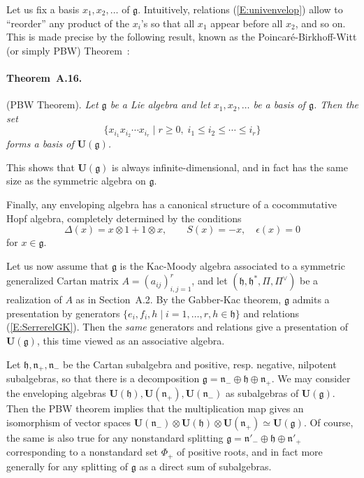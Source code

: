 \documentclass[a4paper,10pt]{amsart}
\def\U{\mathbf{U}}
\def\g{\mathfrak{g}}
\def\h{\mathfrak{h}}
\def\n{\mathfrak{n}}
\numberwithin{equation}{section}
\begin{document}
{Let us fix a basis $x_1, x_2, \ldots$ of $\g$. Intuitively, relations (\ref{E:univenvelop}) allow to ``reorder'' any product of the $x_i$'s so that all $x_1$ appear before all $x_2$, and so on. This is made precise by the following result, known as the Poincar\'e-Birkhoff-Witt (or simply PBW) Theorem~:

\vspace{.1in}

\paragraph{\textbf{Theorem~A.16.}}(PBW Theorem). \textit{Let $\g$ be a Lie algebra and let $x_1, x_2, \ldots$ be a basis of $\g$. Then the set
$$\{x_{i_1} x_{i_2} \cdots x_{i_r}\;|\; r \geq 0, \;i_1 \leq i_2 \leq \cdots \leq i_r\}$$
forms a basis of $\U(\g)$.}

\vspace{.15in}

This shows that $\U(\g)$ is always infinite-dimensional, and in fact has the same size as the symmetric algebra on $\g$.

\vspace{.15in}

Finally, any enveloping algebra has a canonical structure of a cocommutative Hopf algebra, completely determined by the conditions
$$\Delta(x)=x \otimes 1 + 1 \otimes x, \qquad S(x)=-x, \quad \epsilon(x)=0$$
for $x \in \g$.

\vspace{.2in}

Let us now assume that $\g$ is the Kac-Moody algebra associated to a symmetric generalized Cartan matrix $A=(a_{ij})_{i,j=1}^r$, and let $(\h,\h^*,\Pi,\Pi^{\vee})$ be a realization of $A$ as in Section~A.2.
By the Gabber-Kac theorem, $\g$ admits a presentation by generators $\{e_i, f_i, h\;|\; i=1, \ldots, r, h \in \h\}$ and relations (\ref{E:SerrerelGK}). Then the \textit{same} generators and relations give a presentation of $\U(\g)$, this time viewed as an associative algebra.

\vspace{.1in}

Let $\h, \n_{+}, \n_-$ be the Cartan subalgebra and positive, resp. negative, nilpotent subalgebras, so that there is a decomposition $\g=\n_- \oplus \h \oplus \n_+$. We may consider the enveloping algebras
$\U(\h), \U(\n_+), \U(\n_-)$ as subalgebras of $\U(\g)$. Then the PBW theorem implies that the multiplication map gives an isomorphism of vector spaces $\U(\n_-) \otimes \U(\h) \otimes \U(\n_+) \simeq \U(\g)$. Of course, the same is also true for any nonstandard splitting $\g=\n'_- \oplus \h \oplus \n'_+$ corresponding to a nonstandard set $\Phi_+$ of positive roots, and in fact more generally for any splitting of $\g$ as a direct sum of subalgebras.

}
\end{document}
